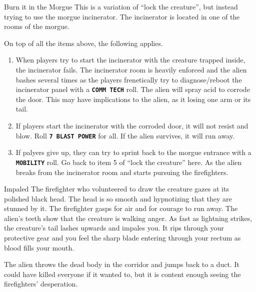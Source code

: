 \begin{rpg-commentbox}{Burn it in the Morgue}
   This is a variation of ``lock the creature'', but instead trying to use the morgue incinerator. The incinerator is located in one of the rooms of the morgue.
   
   On top of all the items above, the following applies.

   \begin{enumerate}
      \item When players try to start the incinerator with the creature trapped inside, the incinerator fails. The incinerator room is heavily enforced and the alien bashes several times as the players frenetically try to diagnose/reboot the incinerator panel with a \texttt{\textbf{COMM TECH}} roll. The alien will spray acid to corrode the door. This may have implications to the alien, as it losing one arm or its tail. 
      
      \item If players start the incinerator with the corroded door, it will not resist and blow. Roll   \texttt{\textbf{7 BLAST POWER}} for all. If the alien survives, it will run away.

      \item If palyers give up, they can try to sprint back to the morgue entrance with a \texttt{\textbf{MOBILITY}} roll. Go back to item 5 of ``lock the creature'' here. As the alien breaks from the incinerator room and starts pursuing the firefighters.
      
   \end{enumerate}
\end{rpg-commentbox}   

\newsect


\begin{rpg-warnbox}{Impaled}
   The firefighter who volunteered to draw the creature gazes at its polished black head. The head is so smooth and hypnotizing that they are stunned by it. The firefighter gasps for air and for courage to run away. The alien's teeth show that the creature is walking anger. As fast as lightning strikes, the creature's tail lashes upwards and impales you. It rips through your protective gear and you feel the sharp blade entering through your rectum as blood fills your mouth. 

   The alien throws the dead body in the corridor and jumps back to a duct. It could have killed everyone if it wanted to, but it is content enough seeing the firefighters' desperation.
\end{rpg-warnbox}



